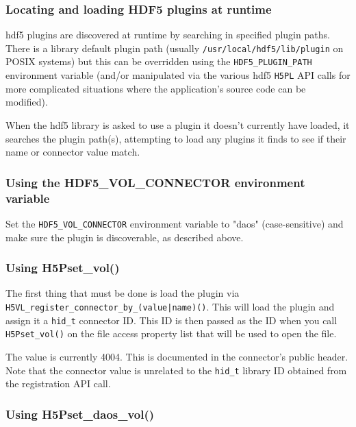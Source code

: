 \documentclass[../users_guide.tex]{subfiles}
\begin{document}
\subsubsection{Locating and loading HDF5 plugins at runtime}

\acrshort{hdf5} plugins are discovered at runtime by searching in specified
plugin paths. There is a library default plugin path (usually
\texttt{/usr/local/hdf5/lib/plugin} on POSIX systems) but this can be
overridden using the \texttt{HDF5\_PLUGIN\_PATH} environment variable (and/or
manipulated via the various \acrshort{hdf5} \texttt{H5PL} API calls for more
complicated situations where the application's source code can be modified).

When the \acrshort{hdf5} library is asked to use a plugin it doesn't
currently have loaded, it searches the plugin path(s), attempting to load
any plugins it finds to see if their name or connector value match.

\subsubsection{Using the HDF5\_VOL\_CONNECTOR environment variable}

Set the \texttt{HDF5\_VOL\_CONNECTOR} environment variable to "daos"
(case-sensitive) and make sure the \dvc{} plugin is discoverable, as
described above.

\subsubsection{Using H5Pset\_vol()}

The first thing that must be done is load the \dvc{} plugin via \newline
\texttt{H5VL\_register\_connector\_by\_(value|name)()}. This will load the
plugin and assign it a \texttt{hid\_t} connector ID. This ID is then passed
as the \vc{} ID when you call \texttt{H5Pset\_vol()} on the file access
property list that will be used to open the file.

The \dvc{} value is currently 4004. This is documented in the connector's
public header. Note that the connector value is unrelated to the
\texttt{hid\_t} library ID obtained from the registration API call.

\subsubsection{Using H5Pset\_daos\_vol()}
\end{document}
